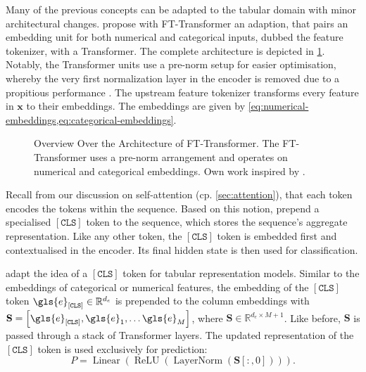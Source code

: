 Many of the previous concepts can be adapted to the tabular domain with minor architectural changes. \textcite[][5]{gorishniyRevisitingDeepLearning2021} propose with FT-Transformer an adaption, that pairs an embedding unit for both numerical and categorical inputs, dubbed the feature tokenizer, with a Transformer. The complete architecture is depicted in \cref{fig:fttransformer}. Notably, the Transformer units use a pre-norm setup for easier optimisation, whereby the very first normalization layer in the encoder is removed due to a propitious performance \textcite[][17]{gorishniyRevisitingDeepLearning2021}. The upstream feature tokenizer transforms every feature in $\mathbf{x}$ to their embeddings. The embeddings are given by \cref{eq:numerical-embeddings,eq:categorical-embeddings}.

\begin{figure}[ht]
    \centering
    {\renewcommand\normalsize{\scriptsize}
        \normalsize
        }
    \caption[Overview Over the FT-Transformer Architecture]{Overview Over the Architecture of FT-Transformer. The FT-Transformer uses a pre-norm arrangement and operates on numerical and categorical embeddings. Own work inspired by \textcite[][4--5]{gorishniyRevisitingDeepLearning2021}.}
    \label{fig:fttransformer}
\end{figure}

Recall from our discussion on self-attention (cp. \cref{sec:attention}), that each \gls{token} encodes the \glspl{token} within the sequence. Based on this notion, \textcite[][4174]{devlinBERTPretrainingDeep2019} prepend a specialised $\mathtt{[CLS]}$ \gls{token} to the sequence, which stores the sequence's aggregate representation. Like any other \gls{token}, the $\mathtt{[CLS]}$ \gls{token} is embedded first and contextualised in the encoder. Its final hidden state is then used for classification.

\textcite[][4]{gorishniyRevisitingDeepLearning2021} adapt the idea of a $\mathtt{[CLS]}$ \gls{token} for tabular representation models. Similar to the embeddings of categorical or numerical features, the embedding of the $[\mathtt{CLS}]$ \gls{token} $\gls{e}_\mathtt{[CLS]} \in \mathbb{R}^{d_{e}}$ is prepended to the column embeddings with $\mathbf{S} = \left[\gls{e}_\mathtt{[CLS]}, \gls{e}_1, \ldots \gls{e}_{M}\right]$, where $\mathbf{S} \in \mathbb{R}^{d_{e} \times M +1}$. Like before, $\mathbf{S}$ is passed through a stack of Transformer layers. The updated representation of the $\mathtt{[CLS]}$ \gls{token} is used exclusively for prediction:
\begin{equation}
    P=\operatorname{Linear}\left(\operatorname{ReLU}\left(\operatorname{LayerNorm}\left(\mathbf{S}\left[:,0\right]\right)\right)\right).
    \label{eq:bert-ft}
\end{equation}

